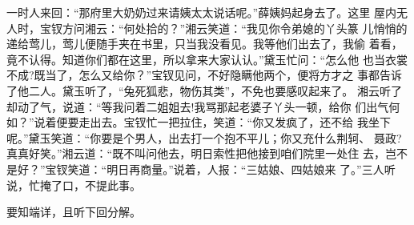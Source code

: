 一时人来回：“那府里大奶奶过来请姨太太说话呢。”薛姨妈起身去了。这里
屋内无人时，宝钗方问湘云：“何处拾的？”湘云笑道：“我见你令弟媳的丫头篆
儿悄悄的递给莺儿，莺儿便随手夹在书里，只当我没看见。我等他们出去了，我偷
着看，竟不认得。知道你们都在这里，所以拿来大家认认。”黛玉忙问：“怎么他
也当衣裳不成?既当了，怎么又给你？”宝钗见问，不好隐瞒他两个，便将方才之
事都告诉了他二人。黛玉听了，“兔死狐悲，物伤其类”，不免也要感叹起来了。
湘云听了却动了气，说道：“等我问着二姐姐去!我骂那起老婆子丫头一顿，给你
们出气何如？”说着便要走出去。宝钗忙一把拉住，笑道：“你又发疯了，还不给
我坐下呢。”黛玉笑道：“你要是个男人，出去打一个抱不平儿；你又充什么荆轲、
聂政?真真好笑。”湘云道：“既不叫问他去，明日索性把他接到咱们院里一处住
去，岂不是好？”宝钗笑道：“明日再商量。”说着，人报：“三姑娘、四姑娘来
了。”三人听说，忙掩了口，不提此事。

要知端详，且听下回分解。